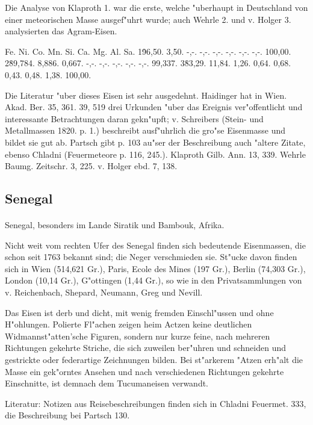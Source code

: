 \documentclass[a4paper, 11pt, oneside]{article}
\begin{document}
Die Analyse von Klaproth 1. war die erste, welche "uberhaupt in Deutschland von einer meteorischen Masse ausgef"uhrt wurde; auch Wehrle 2. und v. Holger 3. analysierten das Agram-Eisen.

Fe. Ni. Co. Mn. Si. Ca. Mg. Al. Sa.  
1\. 96,50. 3,50. -,-. -,-. -,-. -,-. -,-. -,-. 100,00.  
2\. 89,784. 8,886. 0,667. -,-. -,-. -,-. -,-. -,-. 99,337.  
3\. 83,29. 11,84. 1,26. 0,64. 0,68. 0,43. 0,48. 1,38. 100,00.

Die Literatur "uber dieses Eisen ist sehr ausgedehnt. Haidinger hat in Wien. Akad. Ber. 35, 361. 39, 519 drei Urkunden "uber das Ereignis ver"offentlicht und interessante Betrachtungen daran gekn"upft; v. Schreibers (Stein- und Metallmassen 1820. p. 1.) beschreibt ausf"uhrlich die gro"se Eisenmasse und bildet sie gut ab. Partsch gibt p. 103 au"ser der Beschreibung auch "altere Zitate, ebenso Chladni (Feuermeteore p. 116, 245.). Klaproth Gilb. Ann. 13, 339. Wehrle Baumg. Zeitschr. 3, 225. v. Holger ebd. 7, 138.

\subsection{Senegal}
\normalsize
\paragraph{}
Senegal, besonders im Lande Siratik und Bambouk, Afrika.

Nicht weit vom rechten Ufer des Senegal finden sich bedeutende Eisenmassen, die schon seit 1763 bekannt sind; die Neger verschmieden sie. St"ucke davon finden sich in Wien (514,621 Gr.), Paris, Ecole des Mines (197 Gr.), Berlin (74,303 Gr.), London (10,14 Gr.), G"ottingen (1,44 Gr.), so wie in den Privatsammlungen von v. Reichenbach, Shepard, Neumann, Greg und Nevill.

Das Eisen ist derb und dicht, mit wenig fremden Einschl"ussen und ohne H"ohlungen. Polierte Fl"achen zeigen heim Actzen keine deutlichen Widmannst"atten'sche Figuren, sondern nur kurze feine, nach mehreren Richtungen gekehrte Striche, die sich zuweilen ber"uhren und schneiden und gestrickte oder federartige Zeichnungen bilden. Bei st"arkerem "Atzen erh"alt die Masse ein gek"orntes Ansehen und nach verschiedenen Richtungen gekehrte Einschnitte, ist demnach dem Tucumaneisen verwandt.

Literatur: Notizen aus Reisebeschreibungen finden sich in Chladni Feuermet. 333, die Beschreibung bei Partsch 130.
\end{document}
